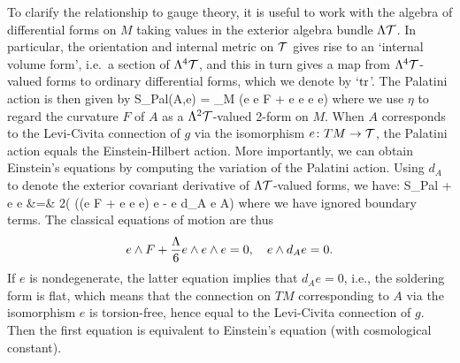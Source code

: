 To clarify the relationship to gauge theory, it is useful to work with
the algebra of differential forms on $M$ taking values in the exterior
algebra bundle $\Lambda {\cal T}$.  In particular, the orientation and
internal metric on ${\cal T}$ gives rise to an `internal volume form', i.e.\ a
section of $\Lambda^4{\cal T}$, and this in turn gives a map from
$\Lambda^4{\cal T}$-valued forms to ordinary differential forms, which we
denote by `${\rm tr}$'.  The Palatini action is then given by
\be
S_{Pal}(A,e) = \int_M \tr(e \we e \we F + {\Lambda{}} e \we e \we
e \we e)
\label{Palaction} \ee
where we use $\eta$ to regard the curvature $F$ of
$A$ as a $\Lambda^2 {\cal T}$-valued 2-form on $M$.  When $A$ corresponds to
the Levi-Civita connection of $g$ via the isomorphism $e \colon TM \rightarrow
{\cal T}$, the Palatini action equals the Einstein-Hilbert action.  More
importantly, we can obtain Einstein's equations by computing the
variation of the Palatini action.  Using $d_A$ to denote the exterior
covariant derivative of $\Lambda {\cal T}$-valued forms, we have:
\ban     \delta S_{Pal}
+ e \we e
&=&  2\int \tr( ((e \we F + {\Lambda {}} e \we e \we e) \we \delta e - e
\we d_A e \we \delta A) \ean
where we have ignored boundary terms.  The classical equations of motion
are thus
\[   e \wedge F + {\Lambda \over 6} e \wedge e \wedge e = 0, \quad e \wedge d_A e =
0.\]
If $e$ is nondegenerate, the latter equation implies that $d_A e
= 0$, i.e., the soldering form is flat, which means that the
connection on $TM$ corresponding to $A$ via the
isomorphism $e$ is torsion-free, hence equal to the Levi-Civita
connection of $g$.  Then the first equation is equivalent to
Einstein's equation (with cosmological constant).

